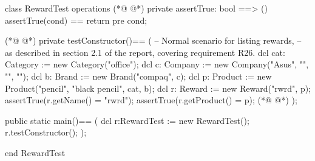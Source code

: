 \begin{vdmpp}[breaklines=true]
class RewardTest
 operations
(*@
\label{assertTrue:3}
@*)
  private assertTrue: bool ==> ()
    assertTrue(cond) == return
    pre cond;
    
(*@
\label{testConstructor:7}
@*)
  private testConstructor()==
  (
    -- Normal scenario for listing rewards,
     -- as described in section 2.1 of the report, covering requirement R26.
    dcl cat: Category := new Category("office");
   dcl c: Company := new Company("Asus", "", "", "");
   dcl b: Brand := new Brand("compaq", c);
    dcl p: Product := new Product("pencil", "black pencil", cat, b);
   dcl r: Reward := new Reward("rwrd", p);
   assertTrue(r.getName() = "rwrd");
   assertTrue(r.getProduct() = p);
(*@
\label{main:18}
@*)
  );
 
  public static main()==
    (
   dcl r:RewardTest := new RewardTest();
   r.testConstructor();
    );

end RewardTest
\end{vdmpp}
